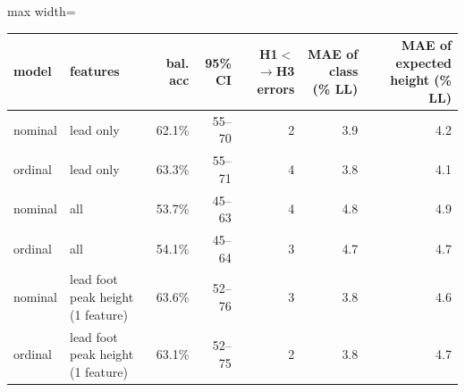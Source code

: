 \begin{adjustbox}{max width=\textwidth}
{\scriptsize
\begin{tabular}{llrrrrr}
\toprule
\textbf{model} & \textbf{features} & \textbf{bal. acc} & \textbf{95\% CI} & \textbf{H1$<$$\rightarrow$H3 errors} & \textbf{MAE of class (\% LL)} & \textbf{MAE of expected height (\% LL)} \\
\midrule
nominal & lead only & 62.1\% & 55--70 & 2 & 3.9 & 4.2 \\
ordinal & lead only & 63.3\% & 55--71 & 4 & 3.8 & 4.1 \\
nominal & all & 53.7\% & 45--63 & 4 & 4.8 & 4.9 \\
ordinal & all & 54.1\% & 45--64 & 3 & 4.7 & 4.7 \\
nominal & lead foot peak height (1 feature) & 63.6\% & 52--76 & 3 & 3.8 & 4.6 \\
ordinal & lead foot peak height (1 feature) & 63.1\% & 52--75 & 2 & 3.8 & 4.7 \\
\bottomrule
\end{tabular}
}
\end{adjustbox}
